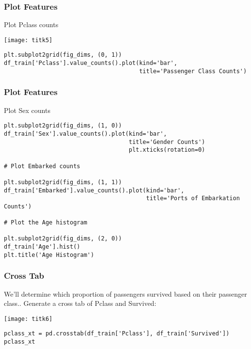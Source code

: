\begin{frame}[fragile]\frametitle{Plot Features}
Plot Pclass counts

\begin{center}
\texttt{[image: titk5]}
\end{center}

\begin{lstlisting}
plt.subplot2grid(fig_dims, (0, 1))
df_train['Pclass'].value_counts().plot(kind='bar', 
                                       title='Passenger Class Counts')
\end{lstlisting}

\end{frame}

\begin{frame}[fragile]\frametitle{Plot Features}
Plot Sex counts
\begin{lstlisting}
plt.subplot2grid(fig_dims, (1, 0))
df_train['Sex'].value_counts().plot(kind='bar', 
                                    title='Gender Counts')
                                    plt.xticks(rotation=0)

# Plot Embarked counts

plt.subplot2grid(fig_dims, (1, 1))
df_train['Embarked'].value_counts().plot(kind='bar', 
                                         title='Ports of Embarkation Counts')

# Plot the Age histogram

plt.subplot2grid(fig_dims, (2, 0))
df_train['Age'].hist()
plt.title('Age Histogram')
\end{lstlisting}
\end{frame}

\begin{frame}[fragile]\frametitle{Cross Tab}
We'll determine which proportion of passengers survived based on their passenger class.. Generate a cross tab of Pclass and Survived:

\begin{center}
\texttt{[image: titk6]}
\end{center}


\begin{lstlisting}
pclass_xt = pd.crosstab(df_train['Pclass'], df_train['Survived'])
pclass_xt
\end{lstlisting}

\end{frame}


